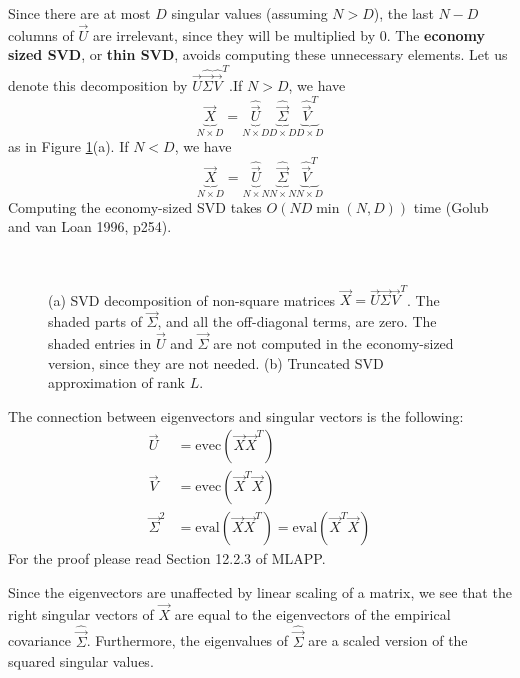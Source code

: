 Since there are at most $D$ singular values (assuming $N>D$), the last $N-D$ columns of $\vec{U}$ are irrelevant, since they will be multiplied by 0. The \textbf{economy sized SVD}, or \textbf{thin SVD}, avoids computing these unnecessary elements. Let us denote this decomposition by $\hat{\vec{U}}\hat{\vec{\Sigma}}\hat{\vec{V}}^T$.If $N>D$, we have
\begin{equation}
\underbrace{\vec{X}}_{N \times D}=\underbrace{\hat{\vec{U}}}_{N \times D}\underbrace{\hat{\vec{\Sigma}}}_{D \times D}\underbrace{\hat{\vec{V}}^T}_{D \times D}
\end{equation}
as in Figure \ref{fig:SVD}(a). If $N<D$, we have
\begin{equation}
\underbrace{\vec{X}}_{N \times D}=\underbrace{\hat{\vec{U}}}_{N \times N}\underbrace{\hat{\vec{\Sigma}}}_{N \times N}\underbrace{\hat{\vec{V}}^T}_{N \times D}
\end{equation}
Computing the economy-sized SVD takes $O(ND\min(N,D))$ time (Golub and van Loan 1996, p254).

\begin{figure}[hbtp]
\centering
{} \\
\caption{(a) SVD decomposition of non-square matrices $\vec{X}=\vec{U}\vec{\Sigma}\vec{V}^T$. The shaded parts of $\vec{\Sigma}$, and all the off-diagonal terms, are zero. The shaded entries in $\vec{U}$ and $\vec{\Sigma}$ are not computed in the economy-sized version, since they are not needed. (b) Truncated SVD approximation of rank $L$.}
\label{fig:SVD} 
\end{figure}

The connection between eigenvectors and singular vectors is the following:
\begin{align}
\vec{U}&=\mathrm{evec}(\vec{X}\vec{X}^T) \\
\vec{V}&=\mathrm{evec}(\vec{X}^T\vec{X}) \\
\vec{\Sigma}^2&=\mathrm{eval}(\vec{X}\vec{X}^T)=\mathrm{eval}(\vec{X}^T\vec{X})
\end{align}
For the proof please read Section 12.2.3 of MLAPP.

Since the eigenvectors are unaffected by linear scaling of a matrix, we see that the right singular vectors of $\vec{X}$ are equal to the eigenvectors of the empirical covariance $\hat{\vec{\Sigma}}$. Furthermore, the eigenvalues of $\hat{\vec{\Sigma}}$ are a scaled version of the squared singular values.

